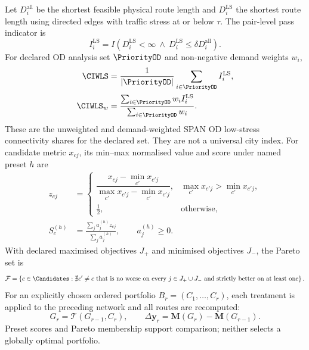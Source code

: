 Let $D_i^{\mathrm{all}}$ be the shortest feasible physical route length and
$D_i^{\mathrm{LS}}$ the shortest route length using directed edges with traffic
stress at or below $\tau$. The pair-level pass indicator is
\begin{equation}
I_i^{\mathrm{LS}}
=I\!\left(D_i^{\mathrm{LS}}<\infty
\ \land\
D_i^{\mathrm{LS}}\le\delta D_i^{\mathrm{all}}\right).
\label{eq:connectivity-pass}
\end{equation}
For declared OD analysis set $\PriorityOD$ and non-negative demand weights $w_i$,
\begin{align}
\CIWLS
 &=\frac{1}{|\PriorityOD|}
   \sum_{i\in\PriorityOD}I_i^{\mathrm{LS}},
\label{eq:ciw-ls-unweighted}\\
\CIWLS_w
 &=\frac{\sum_{i\in\PriorityOD}w_iI_i^{\mathrm{LS}}}
          {\sum_{i\in\PriorityOD}w_i}.
\label{eq:ciw-ls-weighted}
\end{align}
These are the unweighted and demand-weighted SPAN OD low-stress connectivity
shares for the declared set. They are not a universal city index.
For candidate metric $x_{cj}$, its min--max normalised value and score under
named preset $h$ are
\begin{align}
z_{cj}
 &=\begin{cases}
\dfrac{x_{cj}-\min_{c'}x_{c'j}}
      {\max_{c'}x_{c'j}-\min_{c'}x_{c'j}},
& \max_{c'}x_{c'j}>\min_{c'}x_{c'j},\\
\tfrac12, & \text{otherwise},
\end{cases}
\label{eq:preset-normalisation}\\
S_c^{(h)}
 &=\frac{\sum_j a_j^{(h)}z_{cj}}{\sum_j a_j^{(h)}},
\qquad a_j^{(h)}\ge0.
\label{eq:preset-score}
\end{align}
With declared maximised objectives $J_+$ and minimised objectives $J_-$, the
Pareto set is
\begin{equation}
\mathcal{F}
=\left\{c\in\Candidates:
\nexists c'\ne c\ \text{that is no worse on every }j\in J_+\cup J_-
\text{ and strictly better on at least one}\right\}.
\label{eq:pareto-frontier}
\end{equation}
For an explicitly chosen ordered portfolio $B_r=(C_1,\ldots,C_r)$, each
treatment is applied to the preceding network and all routes are recomputed:
\begin{equation}
G_r=\mathcal{T}(G_{r-1},C_r),
\qquad
\Delta\mathbf y_r=\mathbf M(G_r)-\mathbf M(G_{r-1}).
\label{eq:portfolio-change}
\end{equation}
Preset scores and Pareto membership support comparison; neither selects a
globally optimal portfolio.
